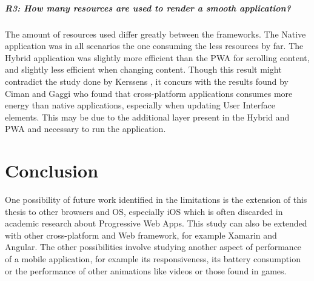 \paragraph{R3: How many resources are used to render a smooth application?}
The amount of resources used differ greatly between the frameworks. The Native application was in all scenarios the one consuming the less resources by far. The Hybrid application was slightly more efficient than the PWA for scrolling content, and slightly less efficient when changing content. Though this result might contradict the study done by Kerssens \cite{PWAapplicability}, it concurs with the results found by Ciman and Gaggi \cite{ciman2017empirical} who found that cross-platform applications consumes more energy than native applications, especially when updating User Interface elements. This may be due to the additional layer present in the Hybrid and PWA and necessary to run the application.
\fi

\chapter{Conclusion}

One possibility of future work identified in the limitations is the extension of this thesis to other browsers and OS, especially iOS which is often discarded in academic research about Progressive Web Apps. This study can also be extended with other cross-platform and Web framework, for example Xamarin and Angular.\newline
The other possibilities involve studying another aspect of performance of a mobile application, for example its responsiveness, its battery consumption or the performance of other animations like videos or those found in games.
